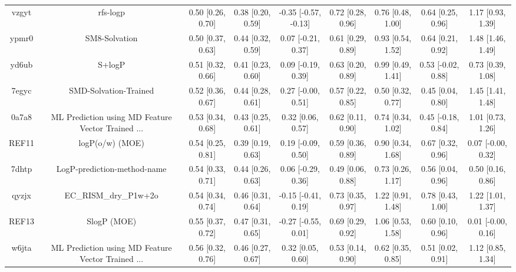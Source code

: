 \documentclass{article}
\begin{document}
\begin{center}
\begin{longtable}{|ccccccccc|}
 vzgyt &                                           rfs-logp &  0.50 [0.26, 0.70] &  0.38 [0.20, 0.59] &  -0.35 [-0.57, -0.13] &  0.72 [0.28, 0.96] &    0.76 [0.48, 1.00] &    0.64 [0.25, 0.96] &     1.17 [0.93, 1.39] \\
 ypmr0 &                                      SM8-Solvation &  0.50 [0.37, 0.63] &  0.44 [0.32, 0.59] &    0.07 [-0.21, 0.37] &  0.61 [0.29, 0.89] &    0.93 [0.54, 1.52] &    0.64 [0.21, 0.92] &     1.48 [1.46, 1.49] \\
 yd6ub &                                             S+logP &  0.51 [0.32, 0.66] &  0.41 [0.23, 0.60] &    0.09 [-0.19, 0.39] &  0.63 [0.20, 0.89] &    0.99 [0.49, 1.41] &   0.53 [-0.02, 0.88] &     0.73 [0.39, 1.08] \\
 7egyc &                              SMD-Solvation-Trained &  0.52 [0.36, 0.67] &  0.44 [0.28, 0.61] &    0.27 [-0.00, 0.51] &  0.57 [0.22, 0.85] &    0.50 [0.32, 0.77] &    0.45 [0.04, 0.80] &     1.45 [1.41, 1.48] \\
 0a7a8 &  ML Prediction using MD Feature Vector Trained ... &  0.53 [0.34, 0.68] &  0.43 [0.25, 0.61] &     0.32 [0.06, 0.57] &  0.62 [0.11, 0.90] &    0.74 [0.34, 1.02] &   0.45 [-0.18, 0.84] &     1.01 [0.73, 1.26] \\
 REF11 &                                    logP(o/w) (MOE) &  0.54 [0.25, 0.81] &  0.39 [0.19, 0.63] &    0.19 [-0.09, 0.50] &  0.59 [0.36, 0.89] &    0.90 [0.34, 1.68] &    0.67 [0.32, 0.96] &    0.07 [-0.00, 0.32] \\
 7dhtp &                        LogP-prediction-method-name &  0.54 [0.33, 0.71] &  0.44 [0.26, 0.63] &    0.06 [-0.29, 0.36] &  0.49 [0.06, 0.88] &    0.73 [0.26, 1.17] &    0.56 [0.04, 0.96] &     0.50 [0.16, 0.86] \\
 qyzjx &                              EC\_RISM\_dry\_P1w+2o &  0.54 [0.34, 0.74] &  0.46 [0.31, 0.64] &   -0.15 [-0.41, 0.19] &  0.73 [0.35, 0.97] &    1.22 [0.91, 1.48] &    0.78 [0.43, 1.00] &     1.22 [1.01, 1.37] \\
 REF13 &                                        SlogP (MOE) &  0.55 [0.37, 0.72] &  0.47 [0.31, 0.65] &   -0.27 [-0.55, 0.01] &  0.69 [0.29, 0.92] &    1.06 [0.53, 1.58] &    0.60 [0.10, 0.96] &    0.01 [-0.00, 0.16] \\
 w6jta &  ML Prediction using MD Feature Vector Trained ... &  0.56 [0.32, 0.76] &  0.46 [0.27, 0.67] &     0.32 [0.05, 0.60] &  0.53 [0.14, 0.90] &    0.62 [0.35, 0.85] &    0.51 [0.02, 0.91] &     1.12 [0.85, 1.34] \\

\end{longtable}
\end{center}
\end{document}
